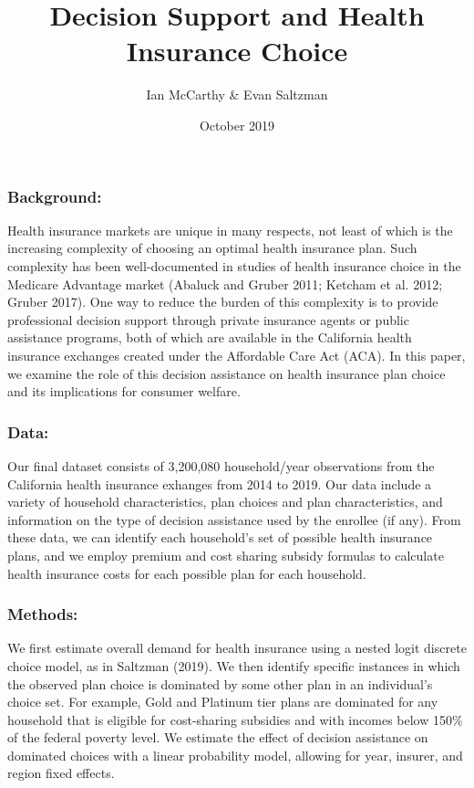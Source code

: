 \documentclass[12pt,]{article}
\title{Decision Support and Health Insurance Choice}
\author{Ian McCarthy \& Evan Saltzman}
\date{October 2019}
\begin{document}
\maketitle

\hypertarget{background}{%
\subsubsection{Background:}\label{background}}

Health insurance markets are unique in many respects, not least of which
is the increasing complexity of choosing an optimal health insurance
plan. Such complexity has been well-documented in studies of health
insurance choice in the Medicare Advantage market (Abaluck and Gruber
2011; Ketcham et al. 2012; Gruber 2017). One way to reduce the burden of
this complexity is to provide professional decision support through
private insurance agents or public assistance programs, both of which
are available in the California health insurance exchanges created under
the Affordable Care Act (ACA). In this paper, we examine the role of
this decision assistance on health insurance plan choice and its
implications for consumer welfare.

\hypertarget{data}{%
\subsubsection{Data:}\label{data}}

Our final dataset consists of 3,200,080 household/year observations from
the California health insurance exhanges from 2014 to 2019. Our data
include a variety of household characteristics, plan choices and plan
characteristics, and information on the type of decision assistance used
by the enrollee (if any). From these data, we can identify each
household's set of possible health insurance plans, and we employ
premium and cost sharing subsidy formulas to calculate health insurance
costs for each possible plan for each household.

\hypertarget{methods}{%
\subsubsection{Methods:}\label{methods}}

We first estimate overall demand for health insurance using a nested
logit discrete choice model, as in Saltzman (2019). We then identify
specific instances in which the observed plan choice is dominated by
some other plan in an individual's choice set. For example, Gold and
Platinum tier plans are dominated for any household that is eligible for
cost-sharing subsidies and with incomes below 150\% of the federal
poverty level. We estimate the effect of decision assistance on
dominated choices with a linear probability model, allowing for year,
insurer, and region fixed effects.
\end{document}
